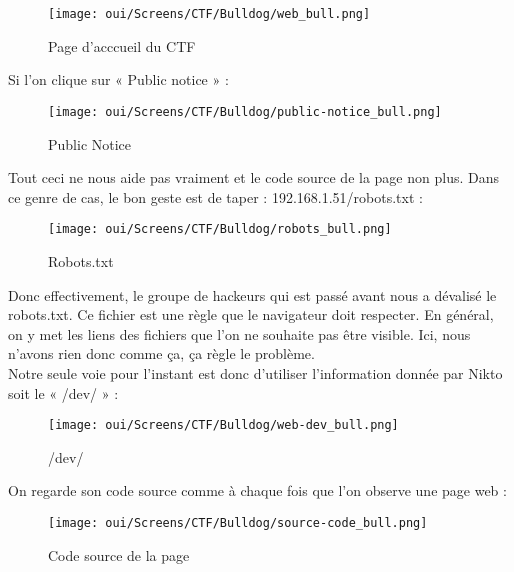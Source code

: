 \begin{figure}[htp!]
  \centering
  \setlength\figureheight{7cm}
  \setlength\figurewidth{9cm}
  \texttt{[image: oui/Screens/CTF/Bulldog/web\_bull.png]}
  \caption{Page d'acccueil du CTF}
  \label{fig:courbe-tikz}
\end{figure}

\newpage
Si l’on clique sur « Public notice » :

\begin{figure}[htp!]
  \centering
  \setlength\figureheight{7cm}
  \setlength\figurewidth{9cm}
  \texttt{[image: oui/Screens/CTF/Bulldog/public-notice\_bull.png]}
  \caption{Public Notice}
  \label{fig:courbe-tikz}
\end{figure}

Tout ceci ne nous aide pas vraiment et le code source de la page non plus. Dans ce genre de cas, le bon geste est de taper : 192.168.1.51/robots.txt :

\begin{figure}[htp!]
  \centering
  \setlength\figureheight{7cm}
  \setlength\figurewidth{9cm}
  \texttt{[image: oui/Screens/CTF/Bulldog/robots\_bull.png]}
  \caption{Robots.txt}
  \label{fig:courbe-tikz}
\end{figure}

Donc effectivement, le groupe de hackeurs qui est passé avant nous a dévalisé le robots.txt. Ce fichier est une règle que le navigateur doit respecter. En général, on y met les liens des fichiers que l’on ne souhaite pas être visible. Ici, nous n’avons rien donc comme ça, ça règle le problème. \\
Notre seule voie pour l’instant est donc d’utiliser l’information donnée par Nikto soit le « /dev/ » :

\begin{figure}[htp!]
  \centering
  \setlength\figureheight{7cm}
  \setlength\figurewidth{9cm}
  \texttt{[image: oui/Screens/CTF/Bulldog/web-dev\_bull.png]}
  \caption{/dev/}
  \label{fig:courbe-tikz}
\end{figure}

\newpage
On regarde son code source comme à chaque fois que l’on observe une page web :

\begin{figure}[htp!]
  \centering
  \setlength\figureheight{7cm}
  \setlength\figurewidth{9cm}
  \texttt{[image: oui/Screens/CTF/Bulldog/source-code\_bull.png]}
  \caption{Code source de la page}
  \label{fig:courbe-tikz}
\end{figure}

